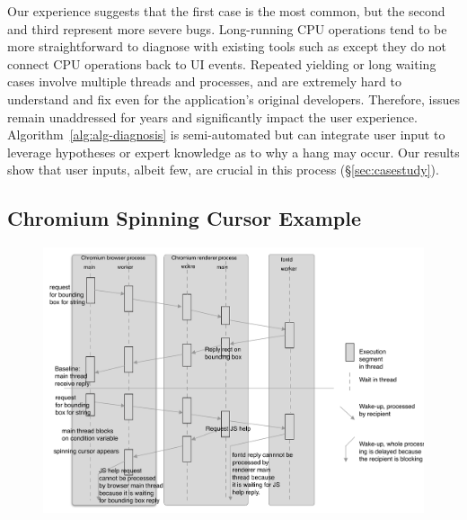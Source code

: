 \noindent
Our experience suggests that the first case is the most common, but the
second and third represent more severe bugs. Long-running CPU operations tend to
be more straightforward to diagnose with existing tools such as \spindump except
they do not connect CPU operations back to UI events. Repeated yielding or
long waiting cases involve multiple threads and processes, and are extremely
hard to understand and fix even for the application's original developers.
Therefore, issues remain unaddressed for years and significantly impact the
user experience. Algorithm~\ref{alg:alg-diagnosis} is semi-automated but can
integrate user input to leverage hypotheses or expert knowledge
as to why a hang may occur. Our results show that user inputs, albeit few, are
crucial in this process (\S\ref{sec:casestudy}).

\subsection{Chromium Spinning Cursor Example}

\begin{figure}[tb]
	\footnotesize
    \centering
	\includegraphics[width=\columnwidth]{./figures/chromium_case_study_2.pdf}
    \label{fig:chromium-case-study}
\end{figure}


